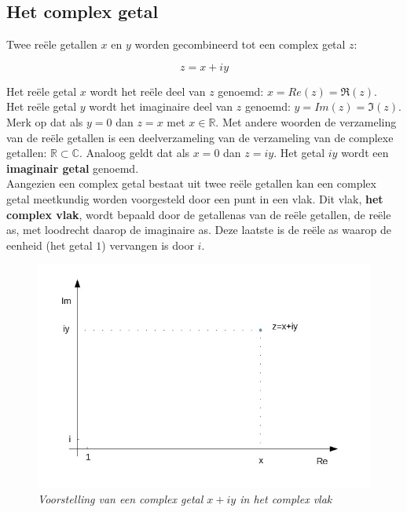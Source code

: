 \subsection{Het complex getal}

Twee re\"{e}le getallen $x$ en $y$ worden gecombineerd tot een complex getal $z$:

\begin{framed}
\[  z=x+iy \]
\end{framed}

Het re\"{e}le getal $x$ wordt het re\"{e}le deel van $z$ genoemd: $x=Re(z)=\Re(z)$.\\
Het re\"{e}le getal $y$ wordt het imaginaire deel van $z$ genoemd: $y=Im(z)=\Im(z)$.\\
Merk op dat als $y=0$ dan $z=x$ met $x \in \mathbb{R}$. Met andere woorden de verzameling van de re\"{e}le getallen is een deelverzameling van de verzameling van de complexe getallen: $\mathbb{R} \subset \mathbb{C}$. Analoog geldt dat als $x=0$ dan $z=iy$. Het getal $iy$ wordt een {\bf imaginair getal} genoemd.\\

Aangezien een complex getal bestaat uit twee re\"{e}le getallen kan een complex getal meetkundig worden voorgesteld door een punt in een vlak. Dit vlak, {\bf het complex vlak}, wordt bepaald door de getallenas van de re\"{e}le getallen, de re\"{e}le as, met loodrecht daarop de imaginaire as. Deze laatste is de re\"{e}le as waarop de eenheid (het getal $1$) vervangen is door $i$.  

\begin{figure}[h]
\begin{center}
\includegraphics[scale=0.6]{3_gonio_complexe_getallen/inputs/complex-getal-1.jpg}
\end{center}
\caption{\it Voorstelling van een complex getal $x+iy$ in het complex vlak}
\end{figure}

